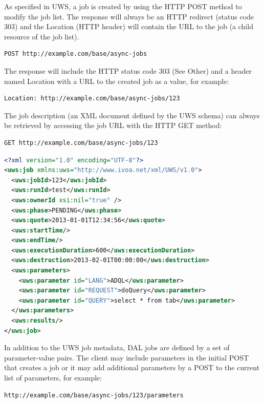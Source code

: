 \documentclass[11pt,letter]{ivoa}
\begin{document}
As specified in UWS, a job is created by using the HTTP POST method to modify 
the job list. The response will always be an HTTP redirect (status code 303) and 
the Location (HTTP header) will contain the URL to the job (a child resource of 
the job list).

\begin{verbatim}
POST http://example.com/base/async-jobs
\end{verbatim}

The response will include the HTTP status code 303 (See Other) and a header 
named Location with a URL to the created job as a value, for example:

\begin{verbatim}
Location: http://example.com/base/async-jobs/123
\end{verbatim}

The job description (an XML document defined by the UWS schema) can always be 
retrieved by accessing the job URL with the HTTP GET method:

\begin{verbatim}
GET http://example.com/base/async-jobs/123
\end{verbatim}

\begin{lstlisting}[language=XML,basicstyle=\footnotesize]
<?xml version="1.0" encoding="UTF-8"?>
<uws:job xmlns:uws="http://www.ivoa.net/xml/UWS/v1.0">
  <uws:jobId>123</uws:jobId>
  <uws:runId>test</uws:runId>
  <uws:ownerId xsi:nil="true" />
  <uws:phase>PENDING</uws:phase>
  <uws:quote>2013-01-01T12:34:56</uws:quote>
  <uws:startTime/>
  <uws:endTime/>
  <uws:executionDuration>600</uws:executionDuration>
  <uws:destruction>2013-02-01T00:00:00</uws:destruction>
  <uws:parameters>
    <uws:parameter id="LANG">ADQL</uws:parameter>
    <uws:parameter id="REQUEST">doQuery</uws:parameter>
    <uws:parameter id="QUERY">select * from tab</uws:parameter>
  </uws:parameters>
  <uws:results/>
</uws:job>
\end{lstlisting}

In addition to the UWS job metadata, DAL jobs are defined by a set of 
parameter-value pairs. The client may include parameters in the initial POST 
that creates a job or it may add additional parameters by a POST to the current 
list of parameters, for example:

\begin{verbatim}
http://example.com/base/async-jobs/123/parameters
\end{verbatim}
\end{document}
